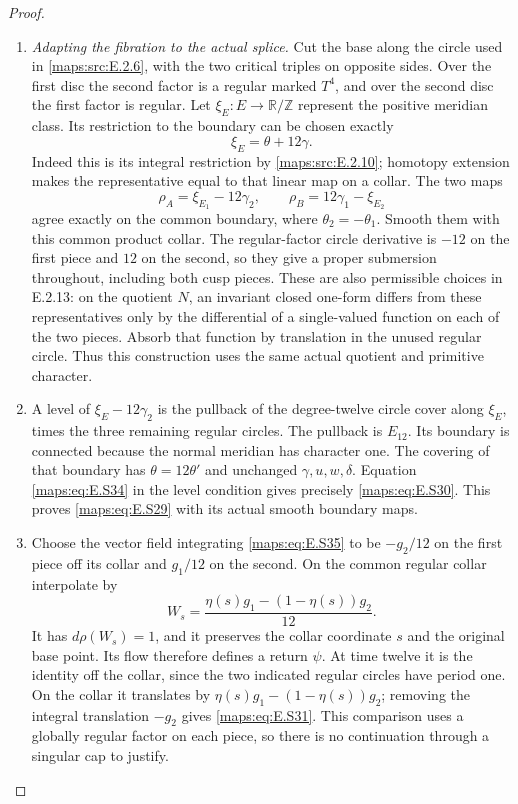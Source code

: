 \begin{proof}
\begin{enumerate}[label=\arabic*.,leftmargin=*]
\item \emph{Adapting the fibration to the actual splice.}
Cut the base along the circle used in \ref{maps:src:E.2.6}, with the two
critical triples on opposite sides. Over the first disc the
second factor is a regular marked $T^4$, and over the second
disc the first factor is regular. Let
$\xi_E:E\to\mathbb R/\mathbb Z$ represent the positive
meridian class. Its restriction to the boundary can be
chosen exactly
\[
                         \xi_E=\theta+12\gamma.
 \tag{E.S34}\label{maps:eq:E.S34}
\]
Indeed this is its integral restriction by \ref{maps:src:E.2.10}; homotopy
extension makes the representative equal to that linear
map on a collar. The two maps
\[
        \rho_A=\xi_{E_1}-12\gamma_2,
             \qquad \rho_B=12\gamma_1-\xi_{E_2}
 \tag{E.S35}\label{maps:eq:E.S35}
\]
agree exactly on the common boundary, where
$\theta_2=-\theta_1$. Smooth them with this common product
collar. The regular-factor circle derivative is $-12$ on
the first piece and $12$ on the second, so they give a
proper submersion throughout, including both cusp pieces.
These are also permissible choices in E.2.13: on the
quotient $N$, an invariant closed one-form differs from
these representatives only by the differential of a
single-valued function on each of the two pieces. Absorb
that function by translation in the unused regular circle.
Thus this construction uses the same actual quotient and
primitive character.

\item A level of $\xi_E-12\gamma_2$ is the pullback of the
degree-twelve circle cover along $\xi_E$, times the three
remaining regular circles. The pullback is $E_{12}$.
Its boundary is connected because the normal meridian has
character one. The covering of that boundary has
$\theta=12\theta'$ and unchanged $\gamma,u,w,\delta$.
Equation \eqref{maps:eq:E.S34} in the level condition gives precisely
\eqref{maps:eq:E.S30}. This proves \eqref{maps:eq:E.S29} with its actual smooth
boundary maps.

\item Choose the vector field integrating \eqref{maps:eq:E.S35} to be
$-g_2/12$ on the first piece off its collar and $g_1/12$
on the second. On the common regular collar interpolate by
\[
                     W_s=\frac{\eta(s)g_1-(1-\eta(s))g_2}{12}.
 \tag{E.S36}\label{maps:eq:E.S36}
\]
It has $d\rho(W_s)=1$, and it preserves the collar
coordinate $s$ and the original base point. Its flow
therefore defines a return $\psi$. At time twelve it is
the identity off the collar, since the two indicated
regular circles have period one. On the collar it
translates by $\eta(s)g_1-(1-\eta(s))g_2$; removing the
integral translation $-g_2$ gives \eqref{maps:eq:E.S31}. This comparison
uses a globally regular factor on each piece, so there
is no continuation through a singular cap to justify.


\end{enumerate}
\end{proof}
